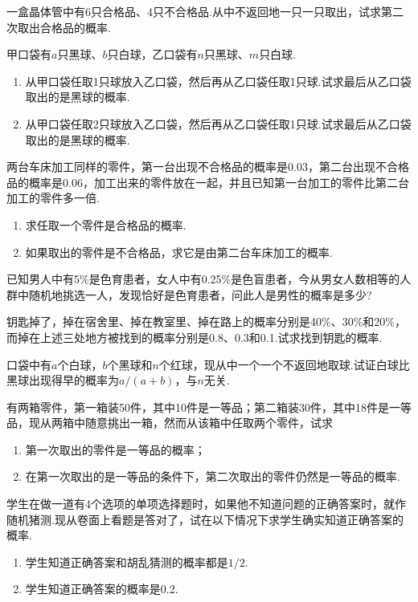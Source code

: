 \begin{xiti}
  \item 一盒晶体管中有6只合格品、4只不合格品.从中不返回地一只一只取出，试求第二次取出合格品的概率.

  \item 甲口袋有$a$只黑球、$b$只白球，乙口袋有$n$只黑球、$m$只白球.
      \begin{enumerate}
        \item 从甲口袋任取1只球放入乙口袋，然后再从乙口袋任取1只球.试求最后从乙口袋取出的是黑球的概率.
        \item 从甲口袋任取2只球放入乙口袋，然后再从乙口袋任取1只球.试求最后从乙口袋取出的是黑球的概率.
      \end{enumerate}

  \item 两台车床加工同样的零件，第一台出现不合格品的概率是0.03，第二台出现不合格品的概率是0.06，加工出来的零件放在一起，并且已知第一台加工的零件比第二台加工的零件多一倍.
      \begin{enumerate}
        \item 求任取一个零件是合格品的概率.
        \item 如果取出的零件是不合格品，求它是由第二台车床加工的概率.
      \end{enumerate}

  \item 已知男人中有5\%是色育患者，女人中有0.25\%是色盲患者，今从男女人数相等的人群中随机地挑选一人，发现恰好是色育患者，问此人是男性的概率是多少?

  \item 钥匙掉了，掉在宿舍里、掉在教室里、掉在路上的概率分别是40\%、30\%和20\%，而掉在上述三处地方被找到的概率分别是0.8、0.3和0.1.试求找到钥匙的概率.

  \item 口袋中有$a$个白球，$b$个黑球和$n$个红球，现从中一个一个不返回地取球.试证白球比黑球出现得早的概率为$a/(a+b)$，与$n$无关.

  \item 有两箱零件，第一箱装50件，其中10件是一等品；第二箱装30件，其中18件是一等品，现从两箱中随意挑出一箱，然而从该箱中任取两个零件，试求
      \begin{enumerate}
        \item 第一次取出的零件是一等品的概率；
        \item 在第一次取出的是一等品的条件下，第二次取出的零件仍然是一等品的概率.
      \end{enumerate}

  \item 学生在做一道有4个选项的单项选择题时，如果他不知道问题的正确答案时，就作随机猪测.现从卷面上看题是答对了，试在以下情况下求学生确实知道正确答案的概率.
      \begin{enumerate}
        \item 学生知道正确答案和胡乱猜测的概率都是$1/2$.
        \item 学生知道正确答案的概率是0.2.
      \end{enumerate}


\end{xiti}
